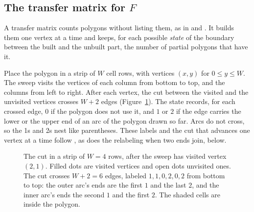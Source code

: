 \documentclass[11pt]{a000104}
\numberwithin{equation}{section}
\begin{document}
\subsection{The transfer matrix for \texorpdfstring{$F$}{F}}\label{sec:tm}

A transfer matrix counts polygons without listing them, as in \textcite{Enting:1980} and \textcite{JensenGuttmann:2000}.
It builds them one vertex at a time and keeps, for each possible \emph{state} of the boundary between the built and the unbuilt part, the number of partial polygons that have it.

Place the polygon in a strip of $W$ cell rows, with vertices $(x, y)$ for $0 \le y \le W$.
The sweep visits the vertices of each column from bottom to top, and the columns from left to right.
After each vertex, the cut between the visited and the unvisited vertices crosses $W + 2$ edges (Figure~\ref{fig:cut}).
The state records, for each crossed edge, $0$ if the polygon does not use it, and $1$ or $2$ if the edge carries the lower or the upper end of an arc of the polygon drawn so far.
Arcs do not cross, so the 1s and 2s nest like parentheses.
These labels and the cut that advances one vertex at a time follow \textcite[Sects.~4--5]{Enting:1980}, as does the relabeling when two ends join, below.

\begin{figure}[!htbp]
  \centering
  \caption{The cut in a strip of $W = 4$ rows, after the sweep has visited vertex $(2, 1)$. Filled dots are visited vertices and open dots unvisited ones. The cut crosses $W + 2 = 6$ edges, labeled $1, 1, 0, 2, 0, 2$ from bottom to top: the outer arc's ends are the first $1$ and the last $2$, and the inner arc's ends the second $1$ and the first $2$. The shaded cells are inside the polygon.}
  \label{fig:cut}
\end{figure}
\end{document}

